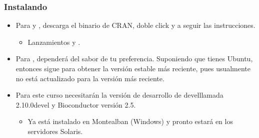 \begin{frame}[allowframebreaks]
  \frametitle{Instalando }
  \begin{itemize}
  \item Para  y , descarga el binario de CRAN, doble click y a seguir las instrucciones.
  \begin{itemize}
  \item Lanzamientos  y .
  \end{itemize}
  \item Para , depender\'a del sabor de tu preferencia. Suponiendo que tienes Ubuntu, entonces sigue  para obtener la versi\'on estable m\'as reciente, pues  usualmente no est\'a actualizado para la versi\'on m\'as reciente.
  \item Para este curso necesitar\'an la versi\'on de desarrollo de  develllamada 2.10.0devel y Bioconductor versi\'on 2.5.
  \begin{itemize}
  \item Ya est\'a instalado en Montealban (Windows) y pronto estar\'a en los servidores Solaris.
  \end{itemize}
  \end{itemize}
\end{frame}

